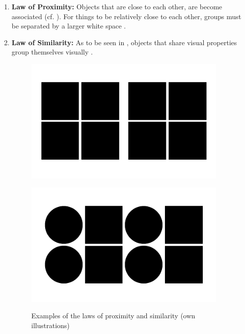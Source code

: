 \begin{enumerate}
    \item \textbf{Law of Proximity:} Objects that are close to each other, are become associated (cf. ). For things to be relatively close to each other, groups must be separated by a larger white space \parencite{Seogaard.n.y.}.
    
    \item \textbf{Law of Similarity:} As to be seen in , objects that share visual properties group themselves visually \parencite[cf.][2]{Bakar.2017}.
    
    \begin{figure}[H] 
        \begin{minipage}[b]{.5\linewidth}
            \centering\includegraphics[width=0.94\textwidth]{img/proximity.pdf}
            \label{fig:prox}
        \end{minipage}%
        \begin{minipage}[b]{.5\linewidth}
            \centering\includegraphics[width=0.94\textwidth]{img/similarity.pdf}
            \label{fig:sim}
        \end{minipage}
        \caption[Laws of Proximity and Similarity]{Examples of the laws of proximity and similarity (own illustrations)}\label{fig:law1}
    \end{figure}
    

\end{enumerate}
